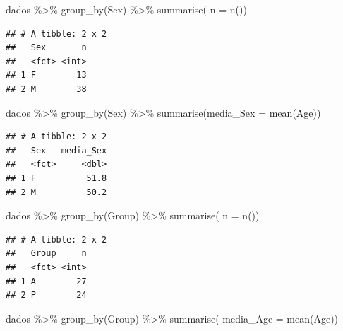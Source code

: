\documentclass[
]{article}
\newenvironment{Shaded}{\begin{snugshade}}{\end{snugshade}}
\newcommand{\AttributeTok}[1]{\textcolor[rgb]{0.77,0.63,0.00}{#1}}
\newcommand{\FunctionTok}[1]{\textcolor[rgb]{0.00,0.00,0.00}{#1}}
\newcommand{\NormalTok}[1]{#1}
\newcommand{\SpecialCharTok}[1]{\textcolor[rgb]{0.00,0.00,0.00}{#1}}
\begin{document}
\begin{Shaded}
\begin{Highlighting}[]
\NormalTok{dados }\SpecialCharTok{\%\textgreater{}\%} 
  \FunctionTok{group\_by}\NormalTok{(Sex) }\SpecialCharTok{\%\textgreater{}\%} 
  \FunctionTok{summarise}\NormalTok{( }\AttributeTok{n =} \FunctionTok{n}\NormalTok{())}
\end{Highlighting}
\end{Shaded}

\begin{verbatim}
## # A tibble: 2 x 2
##   Sex       n
##   <fct> <int>
## 1 F        13
## 2 M        38
\end{verbatim}

\begin{Shaded}
\begin{Highlighting}[]
\NormalTok{dados }\SpecialCharTok{\%\textgreater{}\%} 
  \FunctionTok{group\_by}\NormalTok{(Sex) }\SpecialCharTok{\%\textgreater{}\%} 
  \FunctionTok{summarise}\NormalTok{(}\AttributeTok{media\_Sex =} \FunctionTok{mean}\NormalTok{(Age))}
\end{Highlighting}
\end{Shaded}

\begin{verbatim}
## # A tibble: 2 x 2
##   Sex   media_Sex
##   <fct>     <dbl>
## 1 F          51.8
## 2 M          50.2
\end{verbatim}

\begin{Shaded}
\begin{Highlighting}[]
\NormalTok{dados }\SpecialCharTok{\%\textgreater{}\%} 
  \FunctionTok{group\_by}\NormalTok{(Group) }\SpecialCharTok{\%\textgreater{}\%} 
  \FunctionTok{summarise}\NormalTok{( }\AttributeTok{n =} \FunctionTok{n}\NormalTok{())}
\end{Highlighting}
\end{Shaded}

\begin{verbatim}
## # A tibble: 2 x 2
##   Group     n
##   <fct> <int>
## 1 A        27
## 2 P        24
\end{verbatim}

\begin{Shaded}
\begin{Highlighting}[]
\NormalTok{dados }\SpecialCharTok{\%\textgreater{}\%} 
  \FunctionTok{group\_by}\NormalTok{(Group) }\SpecialCharTok{\%\textgreater{}\%} 
  \FunctionTok{summarise}\NormalTok{( }\AttributeTok{media\_Age =} \FunctionTok{mean}\NormalTok{(Age))}
\end{Highlighting}
\end{Shaded}
\end{document}
